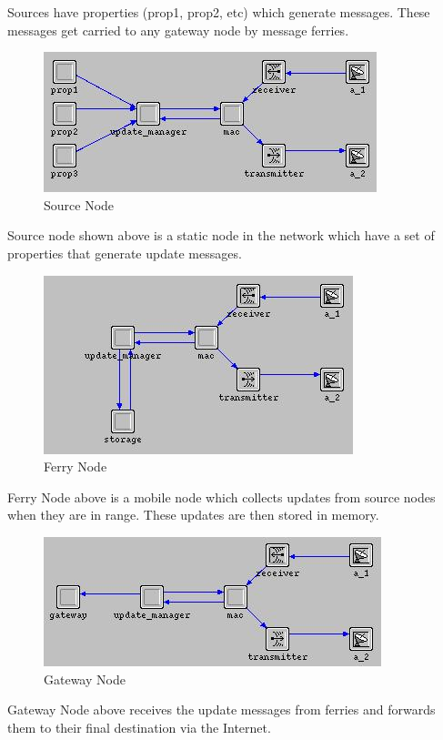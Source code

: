 %

Sources have properties (prop1, prop2, etc) which generate messages. These messages get carried to any gateway node by message ferries.

\begin{figure}[h]
    \centering
    \includegraphics[width=.5\textwidth]{images/source}
    \caption{Source Node}
    \label{fig:source}
\end{figure}

Source node shown above is a static node in the network which have a set of properties that generate update messages. 	

\begin{figure}[h]
    \centering
    \includegraphics[width=.5\textwidth]{images/ferry}
    \caption{Ferry Node}
    \label{fig:Ferry}
\end{figure}

Ferry Node above is a mobile node which collects updates from source nodes when they are in range. These updates are then stored in memory.

\begin{figure}[h]
    \centering
    \includegraphics[width=.5\textwidth]{images/gateway}
    \caption{Gateway Node}
    \label{fig:Gateway}
\end{figure}

Gateway Node above receives the update messages from ferries and forwards them to their final destination via the Internet. 



